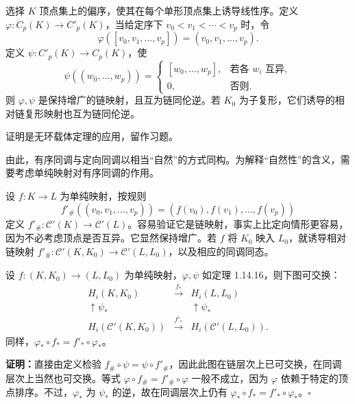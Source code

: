 选择 $K$ 顶点集上的偏序，使其在每个单形顶点集上诱导线性序。定义 $\varphi:C_p(K)\to C'_p(K)$，当给定序下 $v_0<v_1<\cdots<v_p$ 时，令
\[
\varphi([v_0,v_1,\ldots,v_p])=(v_0,v_1,\ldots,v_p).
\]
定义 $\psi:C'_p(K)\to C_p(K)$，使
\[
\psi((w_0,\ldots,w_p))=\begin{cases}
[w_0,\ldots,w_p],&\text{若各 }w_i\text{ 互异},\\
0,&\text{否则}.
\end{cases}
\]
则 $\varphi,\psi$ 是保持增广的链映射，且互为链同伦逆。若 $K_0$ 为子复形，它们诱导的相对链复形映射也互为链同伦逆。

证明是无环载体定理的应用，留作习题。

由此，有序同调与定向同调以相当“自然”的方式同构。为解释“自然性”的含义，需要考虑单纯映射对有序同调的作用。

设 $f:K\to L$ 为单纯映射，按规则
\[
f'_\#((v_0,v_1,\ldots,v_p))=(f(v_0),f(v_1),\ldots,f(v_p))
\]
定义 $f'_\#:\mathcal C'(K)\to\mathcal C'(L)$。容易验证它是链映射，事实上比定向情形更容易，因为不必考虑顶点是否互异。它显然保持增广。若 $f$ 将 $K_0$ 映入 $L_0$，就诱导相对链映射 $f'_\#:\mathcal C'(K,K_0)\to\mathcal C'(L,L_0)$，以及相应的同调同态。

设 $f:(K,K_0)\to(L,L_0)$ 为单纯映射，$\varphi,\psi$ 如定理 1.14.16，则下图可交换：
\[
\begin{array}{ccc}
H_i(K,K_0)&\xrightarrow{f_*}&H_i(L,L_0)\\
\uparrow\scriptstyle\psi_*&&\uparrow\scriptstyle\psi_*\\
H_i(\mathcal C'(K,K_0))&\xrightarrow{f'_*}&H_i(\mathcal C'(L,L_0)).
\end{array}
\]
同样，$\varphi_*\circ f_*=f'_*\circ\varphi_*$。

\noindent\textbf{证明：}直接由定义检验 $f_\#\circ\psi=\psi\circ f'_\#$，因此此图在链层次上已可交换，在同调层次上当然也可交换。等式 $\varphi\circ f_\#=f'_\#\circ\varphi$ 一般不成立，因为 $\varphi$ 依赖于特定的顶点排序。不过，$\varphi_*$ 为 $\psi_*$ 的逆，故在同调层次上仍有 $\varphi_*\circ f_*=f'_*\circ\varphi_*$。\hfill$\square$

